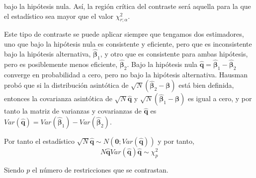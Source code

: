bajo la hip\'otesis nula. As\'i, la regi\'on cr\'itica del contraste ser\'a aquella para la que el estad\'istico sea mayor que el valor $\chi^2_{r;\alpha}$.

Este tipo de contraste se puede aplicar siempre que tengamos dos estimadores, uno que bajo la hip\'otesis nula es consistente y eficiente, pero que es inconsistente bajo la hip\'otesis alternativa, $\hat{\boldsymbol{\beta}}_{1}$, y otro que es consistente para ambas hip\'otesis, pero es posiblemente menos eficiente, $\hat{\boldsymbol{\beta}}_{2}$. Bajo la hip\'otesis nula $\hat{\boldsymbol{q}}=\hat{\boldsymbol{\beta}}_{1}-\hat{\boldsymbol{\beta}}_{2}$ converge en probabilidad a cero, pero no bajo la hip\'otesis alternativa. Hausman prob\'o que si la distribuci\'on asint\'otica de $\sqrt{N}\left(\hat{\boldsymbol{\beta}}_{2}-\boldsymbol{\beta}\right)$ est\'a bien definida, entonces la covarianza asint\'otica de $\sqrt{N}\hat{\boldsymbol{q}}$ y $\sqrt{N}\left(\hat{\boldsymbol{\beta}}_{1}-\boldsymbol{\beta}\right)$ es igual a cero, y por tanto la matriz de varianzas y covarianzas de $\hat{\boldsymbol{q}}$ es $Var\left(\hat{\boldsymbol{q}}\right)=Var\left(\hat{\boldsymbol{\beta}}_{1}\right)-Var\left(\hat{\boldsymbol{\beta}}_{2}\right)$.

Por tanto el estad\'istico $\sqrt{N}\hat{\boldsymbol{q}}\sim N\left(\boldsymbol{0};Var\left(\hat{\boldsymbol{q}}\right)\right)$ y por tanto,
\[N\hat{\boldsymbol{q}}Var\left(\hat{\boldsymbol{q}}\right)\hat{\boldsymbol{q}}\sim\chi^2_p\]

Siendo $p$ el n\'umero de restricciones que se contrastan.



